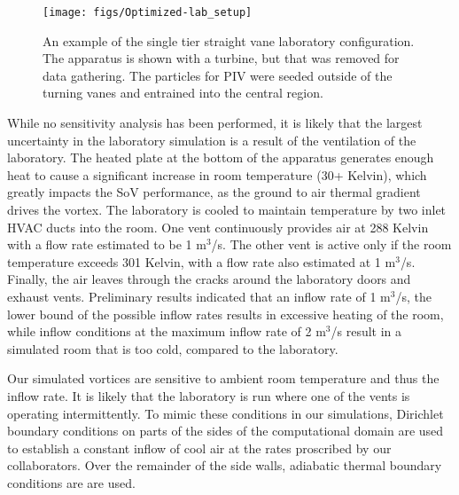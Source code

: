 %
%
 \begin{figure}[!htb]
   \begin{center}
    \texttt{[image: figs/Optimized-lab\_setup]}
    \caption{An example of the single tier straight vane laboratory
    configuration. The apparatus is shown with a turbine, but that was
    removed for data gathering. The particles for PIV were seeded
    outside of the turning vanes and entrained into the central region.}
    \label{fig:lab_image}
   \end{center}
 \end{figure}

While no sensitivity analysis has been performed, it is likely that the
largest uncertainty in the laboratory simulation is a result of the
ventilation of the laboratory. The heated plate at the bottom of the
apparatus generates enough heat to cause a significant increase in room
temperature (30+ Kelvin), which greatly impacts the SoV
performance, as the ground to air thermal gradient drives the
vortex. The laboratory is cooled to maintain
temperature by two inlet HVAC ducts into the room. 
One vent continuously provides air at 288 Kelvin with a flow rate estimated 
to be 1 $\text{m}^3$/s.
The other vent is active only if the room temperature exceeds 301 Kelvin, 
with a flow rate also estimated at 1 $\text{m}^3$/s\cite{mark_comm}.
Finally, the air leaves through the cracks around the laboratory doors and 
exhaust vents. Preliminary results indicated that an inflow rate of 1
$\text{m}^3$/s, the lower bound of the possible inflow rates results in
excessive heating of the room, while inflow conditions at the maximum
inflow rate of 2 $\text{m}^3$/s result in a simulated room that is too cold,
compared to the laboratory.  

Our simulated vortices are sensitive to ambient room temperature and thus 
the inflow rate. It is likely that the laboratory is run where one of
the vents is operating intermittently. 
To mimic these conditions in our simulations, Dirichlet boundary conditions 
on parts of the sides of the computational domain are used to
establish a constant inflow of cool air at the rates 
proscribed by our collaborators. Over the remainder of the side walls, 
adiabatic thermal boundary conditions are are used. 

